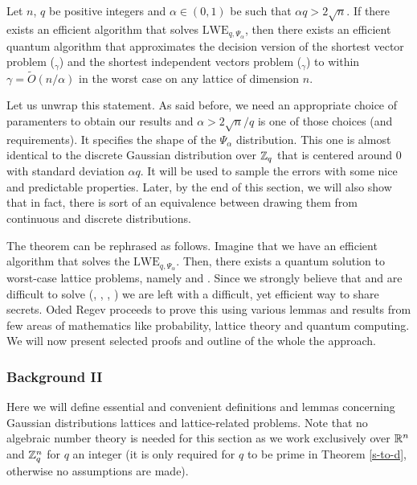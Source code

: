\begin{theorem}\label{main}
	Let $n$, $q$ be positive integers and $\alpha \in (0, 1)$ be such that $\alpha q > 2 \sqrt{n}$. If there exists an efficient algorithm that solves $\text{LWE}_{q, \Psi_{\alpha}}$, then there exists an efficient quantum algorithm that approximates the decision version of the shortest vector problem ($_{\gamma}$) and the shortest independent vectors problem ($_{\gamma}$) to within $\gamma = \tilde{O}(n/\alpha)$ in the worst case on any lattice of dimension $n$.	
\end{theorem}

Let us unwrap this statement. As said before, we need an appropriate choice of paramenters to obtain our results and $\alpha > 2\sqrt{n}/q$ is one of those choices (and requirements). It specifies the shape of the $\Psi_{\alpha}$ distribution. This one is almost identical to the discrete Gaussian distribution over $\mathbb{Z}_q$ that is centered around 0 with standard deviation $\alpha q$. It will be used to sample the errors with some nice and predictable properties. Later, by the end of this section, we will also show that in fact, there is sort of an equivalence between drawing them from continuous and discrete distributions.

The theorem can be rephrased as follows. Imagine that we have an efficient algorithm that solves the $\text{LWE}_{q, \Psi_{\alpha}}$. Then, there exists a quantum solution to worst-case lattice problems, namely  and . Since we strongly believe that  and  are difficult to solve (\cite{svp-hard}, \cite{reductions}, \cite{cvp-hard}, \cite{lbc}) we are left with a difficult, yet efficient way to share secrets. Oded Regev proceeds to prove this using various lemmas and results from few areas of mathematics like probability, lattice theory and quantum computing. We will now present selected proofs and outline of the whole the approach.

\subsubsection{Background II}
Here we will define essential and convenient definitions and lemmas concerning Gaussian distributions lattices and lattice-related problems. Note that no algebraic number theory is needed for this section as we work exclusively over $\mathbb{R}^n$ and $\mathbb{Z}^n_q$ for $q$ an integer (it is only required for $q$ to be prime in Theorem \ref{s-to-d}, otherwise no assumptions are made). 

